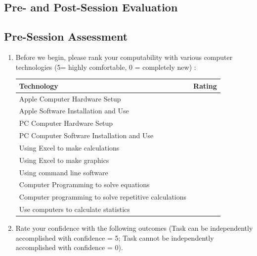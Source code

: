 \documentclass{tufte-handout}\usepackage[]{graphicx}\usepackage[]{color}
\begin{document}
\newpage\newpage
\begin{fullwidth}
\section{Pre- and Post-Session Evaluation}

\subsection{Pre-Session Assessment}
\begin{enumerate}
	\item Before we begin, please rank your computability with various computer technologies (5= highly comfortable, 0 = completely new) :
	
\begin{table}
		\begin{tabular}{|l|l|} \toprule
Technology					& Rating \\ \midrule
Apple Computer Hardware Setup 										& \\
Apple Software Installation and Use								& \\
PC Computer Hardware Setup												& \\
PC Computer Software Installation and Use					& \\
Using Excel to make calculations									& \\
Using Excel to make graphics											& \\
Using command line software												& \\
Computer Programming to solve equations						& \\
Computer programming to solve repetitive calculations & \\
Use computers to calculate statistics							& \\
		\bottomrule
		\end{tabular}
\end{table}	
	
	\item Rate your confidence with the following outcomes (Task can be independently accomplished with confidence = 5; Task cannot be independently accomplished with confidence = 0).
	

\end{enumerate}
\end{fullwidth}
\end{document}
